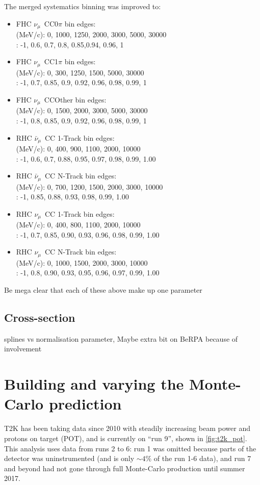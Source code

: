 The merged systematics binning was improved to:
\begin{itemize}
	\item FHC $\nu_{\mu}$~CC0$\pi$ bin edges: \\
	\pmu (MeV/c): 0, 1000, 1250, 2000, 3000, 5000, 30000 \\
	\cosmu:  -1, 0.6, 0.7, 0.8, 0.85,0.94, 0.96, 1
	\item FHC $\nu_{\mu}$~CC1$\pi$  bin edges: \\
	\pmu (MeV/c):  0, 300, 1250, 1500, 5000, 30000 \\
	\cosmu: -1, 0.7, 0.85, 0.9, 0.92, 0.96, 0.98, 0.99, 1
	\item FHC $\nu_{\mu}$~CCOther bin edges: \\
	\pmu (MeV/c): 0, 1500, 2000, 3000, 5000, 30000 \\
	\cosmu:  -1, 0.8, 0.85, 0.9, 0.92, 0.96, 0.98, 0.99, 1
	\item RHC $\bar{\nu}_{\mu}$~CC 1-Track bin edges: \\
	\pmu (MeV/c): 0, 400, 900, 1100, 2000, 10000 \\
	\cosmu:  -1, 0.6, 0.7, 0.88, 0.95, 0.97, 0.98, 0.99, 1.00
	\item RHC $\bar{\nu}_{\mu}$~CC N-Track bin edges: \\
	\pmu (MeV/c):  0, 700, 1200, 1500, 2000, 3000, 10000 \\
	\cosmu: -1, 0.85, 0.88, 0.93, 0.98, 0.99, 1.00
	\item RHC $\nu_{\mu}$~CC 1-Track bin edges: \\
	\pmu (MeV/c):  0, 400, 800, 1100, 2000, 10000 \\
	\cosmu:   -1, 0.7, 0.85, 0.90, 0.93, 0.96, 0.98, 0.99, 1.00
	\item RHC $\nu_{\mu}$~CC N-Track bin edges: \\
	\pmu (MeV/c):  0, 1000, 1500, 2000, 3000, 10000 \\
	\cosmu: -1, 0.8, 0.90, 0.93, 0.95, 0.96, 0.97, 0.99, 1.00
\end{itemize}
Be mega clear that each of these above make up one parameter

\subsection{Cross-section}
\label{subsec:syst_xsec}
splines vs normalisation parameter, Maybe extra bit on BeRPA because of involvement

\section{Building and varying the Monte-Carlo prediction}
T2K has been taking data since 2010 with steadily increasing beam power and protons on target (POT), and is currently on ``run 9'', shown in \autoref{fig:t2k_pot}. This analysis uses data from runs 2 to 6: run 1 was omitted because parts of the detector was uninstrumented (and is only $\sim4\%$ of the run 1-6 data), and run 7 and beyond had not gone through full Monte-Carlo production until summer 2017. 

